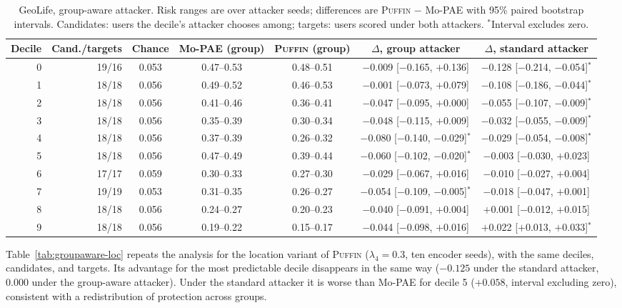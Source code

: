 \documentclass[sigconf,anonymous,review]{acmart}
\newcommand{\puffin}{\textsc{Puffin}}
\begin{document}
\begin{table}[!htbp]
\centering
\caption{GeoLife, group-aware attacker. Risk ranges are over attacker seeds; differences are \puffin{} $-$ Mo-PAE with 95\% paired bootstrap intervals. Candidates: users the decile's attacker chooses among; targets: users scored under both attackers. $^*$Interval excludes zero.}
\label{tab:groupaware}
\scriptsize
\begin{tabular}{@{}rrccccc@{}}
\toprule
Decile & Cand./targets & Chance & Mo-PAE (group) & \puffin{} (group) & $\Delta$, group attacker & $\Delta$, standard attacker \\
\midrule
0 & 19/16 & 0.053 & 0.47--0.53 & 0.48--0.51 & $-$0.009 [$-$0.165, $+$0.136] & $-$0.128 [$-$0.214, $-$0.054]$^*$ \\
1 & 18/18 & 0.056 & 0.49--0.52 & 0.46--0.53 & $-$0.001 [$-$0.073, $+$0.079] & $-$0.108 [$-$0.186, $-$0.044]$^*$ \\
2 & 18/18 & 0.056 & 0.41--0.46 & 0.36--0.41 & $-$0.047 [$-$0.095, $+$0.000] & $-$0.055 [$-$0.107, $-$0.009]$^*$ \\
3 & 18/18 & 0.056 & 0.35--0.39 & 0.30--0.34 & $-$0.048 [$-$0.115, $+$0.009] & $-$0.032 [$-$0.055, $-$0.009]$^*$ \\
4 & 18/18 & 0.056 & 0.37--0.39 & 0.26--0.32 & $-$0.080 [$-$0.140, $-$0.029]$^*$ & $-$0.029 [$-$0.054, $-$0.008]$^*$ \\
5 & 18/18 & 0.056 & 0.47--0.49 & 0.39--0.44 & $-$0.060 [$-$0.102, $-$0.020]$^*$ & $-$0.003 [$-$0.030, $+$0.023] \\
6 & 17/17 & 0.059 & 0.30--0.33 & 0.27--0.30 & $-$0.029 [$-$0.067, $+$0.016] & $-$0.010 [$-$0.027, $+$0.004] \\
7 & 19/19 & 0.053 & 0.31--0.35 & 0.26--0.27 & $-$0.054 [$-$0.109, $-$0.005]$^*$ & $-$0.018 [$-$0.047, $+$0.001] \\
8 & 18/18 & 0.056 & 0.24--0.27 & 0.20--0.23 & $-$0.040 [$-$0.091, $+$0.004] & $+$0.001 [$-$0.012, $+$0.015] \\
9 & 18/18 & 0.056 & 0.19--0.22 & 0.15--0.17 & $-$0.044 [$-$0.098, $+$0.016] & $+$0.022 [$+$0.013, $+$0.033]$^*$ \\
\bottomrule
\end{tabular}
\end{table}

Table~\ref{tab:groupaware-loc} repeats the analysis for the location variant of \puffin{} ($\lambda_4=0.3$, ten encoder seeds), with the same deciles, candidates, and targets. Its advantage for the most predictable decile disappears in the same way ($-0.125$ under the standard attacker, $0.000$ under the group-aware attacker). Under the standard attacker it is worse than Mo-PAE for decile 5 ($+0.058$, interval excluding zero), consistent with a redistribution of protection across groups.
\end{document}
